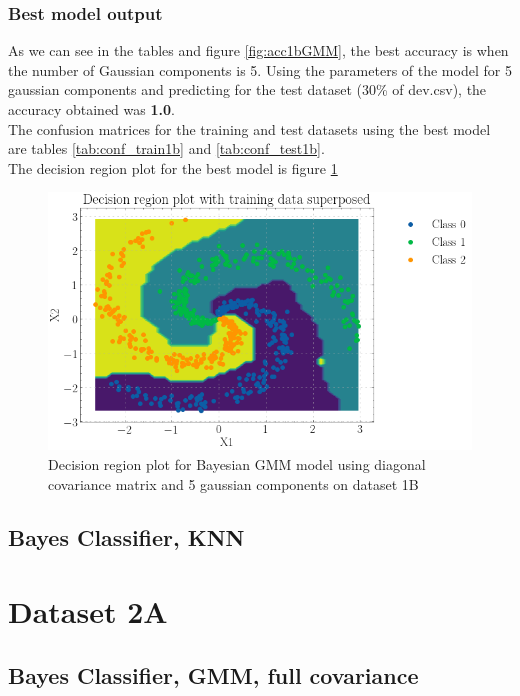 \documentclass[11pt,a4paper]{article}
\begin{document}
\subsubsection{Best model output}
As we can see in the tables and figure \ref{fig:acc1bGMM}, the best accuracy is when the number of Gaussian components is 5. Using the parameters of the model for 5 gaussian components and predicting for the test dataset (30\% of dev.csv), the accuracy obtained was \textbf{1.0}.\\
The confusion matrices for the training and test datasets using the best model are tables \ref{tab:conf_train1b} and \ref{tab:conf_test1b}.\\



The decision region plot for the best model is figure \ref{fig:dec1bGMMdiag}
\begin{figure}[H]
    \centering
    \includegraphics[scale = 0.5]{images/decisionReg_ds2.png}
    \caption{Decision region plot for Bayesian GMM model using diagonal covariance matrix and 5 gaussian components on dataset 1B}
    \label{fig:dec1bGMMdiag}
\end{figure}
\subsection{Bayes Classifier, KNN}

\break
\section{Dataset 2A}
\subsection{Bayes Classifier, GMM, full covariance}
\end{document}
